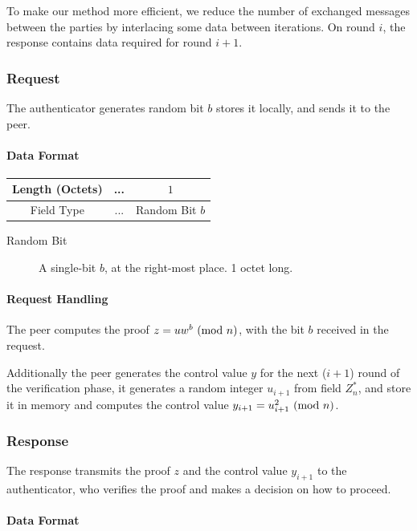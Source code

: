 To make our method more efficient, we reduce the number of exchanged messages between the parties by interlacing some data between iterations.
On round $i$, the response contains data required for round $i+1$.

\subsubsection{Request}
The authenticator generates random bit $b$ stores it locally, and sends it to the peer.
\paragraph{Data Format}

\begin{center}
\begin{tabular}{|c|c|c|}
	\hline
	Length (Octets) & ... & $1$ \\
	\hline
	Field Type & ... & Random Bit $b$\\
	\hline
\end{tabular}
\end{center}

\begin{description}
	\item[Random Bit] A single-bit $b$, at the right-most place. 1 octet long.
\end{description}

\paragraph{Request Handling}
The peer computes the proof $z = uw^b \ (\mathrm{mod}\ n)$, with the bit $b$ received in the request.

Additionally the peer generates the control value $y$ for the next ($i+1$) round of the verification phase, it generates a random integer $u_{i+1}$ from field $Z^*_n$, and store it in memory and computes the control value $y_{i+1} = u_{i+1}^2 \ (\mathrm{mod}\ n)$.

\subsubsection{Response}

The response transmits the proof $z$ and the control value $y_{i+1}$ to the authenticator, who verifies the proof and makes a decision on how to proceed.
\paragraph{Data Format}

